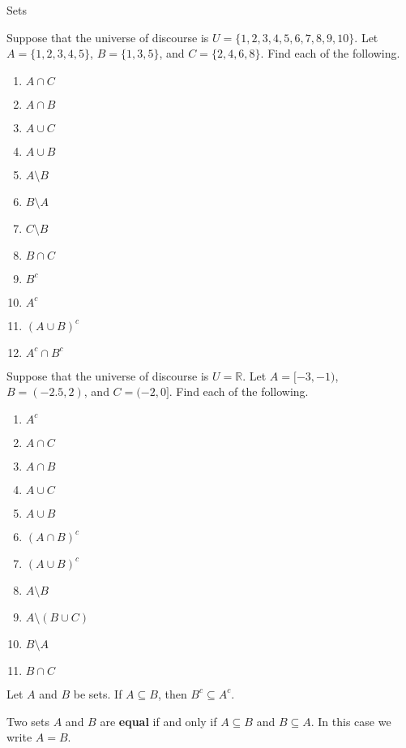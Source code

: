 \begin{section}{Sets}
\begin{exercise}
Suppose that the universe of discourse is $U=\{1,2,3,4,5,6,7,8,9,10\}$.  Let $A=\{1, 2, 3, 4, 5\}$, $B=\{1, 3, 5\}$, and $C=\{2, 4, 6, 8\}$.  Find each of the following.
\begin{enumerate}
  \item $A \cap C$
  \item $A \cap B$
  \item $A \cup C$
  \item $A \cup B$
  \item $A\setminus B$
  \item $B \setminus A$
  \item $C \setminus B$
  \item $B \cap C$
  \item $B^c$
  \item $A^c$
  \item $(A\cup B)^c$
  \item $A^c\cap B^c$
\end{enumerate}
\end{exercise}

\begin{exercise}
Suppose that the universe of discourse is $U=\mathbb{R}$.  Let $A=[-3,-1)$, $B=(-2.5,2)$, and $C=(-2,0]$.  Find each of the following.
\begin{enumerate}
\item $A^c$
  \item $A \cap C$
  \item $A \cap B$
  \item $A \cup C$
  \item $A \cup B$
  \item $(A\cap B)^c$
  \item $(A\cup B)^c$
  \item $A \setminus B$
  \item $A\setminus (B \cup C)$
  \item $B \setminus A$
  \item $B \cap C$
\end{enumerate}
\end{exercise}

\begin{theorem}[*]
Let $A$ and $B$ be sets.  If $A \subseteq B$, then $B^c \subseteq A^c$.
\end{theorem}

\begin{definition}
Two sets $A$ and $B$ are \textbf{equal} if and only if $A \subseteq B$ and $B \subseteq A$.  In this case we write $A = B$.
\end{definition}


\end{section}
